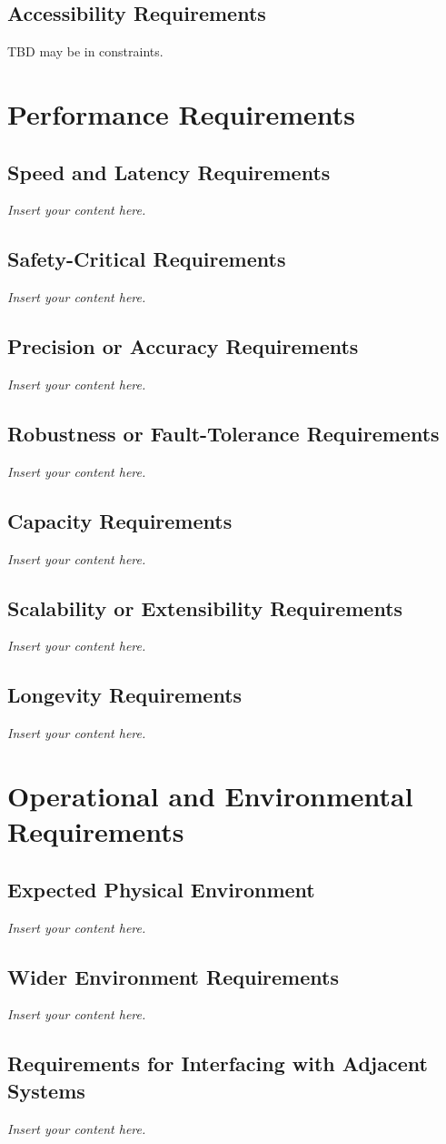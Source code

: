 \documentclass[12pt]{article}
\newcommand{\lips}{\textit{Insert your content here.}}
\begin{document}
\subsection{Accessibility Requirements}
TBD may be in constraints.
\section{Performance Requirements}
\subsection{Speed and Latency Requirements}
\lips
\subsection{Safety-Critical Requirements}
\lips
\subsection{Precision or Accuracy Requirements}
\lips
\subsection{Robustness or Fault-Tolerance Requirements}
\lips
\subsection{Capacity Requirements}
\lips
\subsection{Scalability or Extensibility Requirements}
\lips
\subsection{Longevity Requirements}
\lips

\section{Operational and Environmental Requirements}
\subsection{Expected Physical Environment}
\lips
\subsection{Wider Environment Requirements}
\lips
\subsection{Requirements for Interfacing with Adjacent Systems}
\lips
\end{document}
